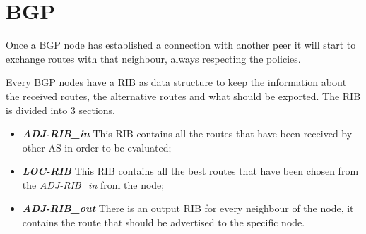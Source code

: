 
\section{BGP}
\label{sec:bgp_intro}

Once a \ac{BGP} node has established a connection with another peer it will
start to exchange routes with that neighbour, always respecting the policies.

Every \ac{BGP} nodes have a \ac{RIB} as data structure to keep the information
about the received routes, the alternative routes and what should be exported.
The \ac{RIB} is divided into \num{3} sections.
\begin{itemize}
	\item \textbf{\textit{ADJ-RIB\_in}} This \ac{RIB} contains all the routes
		that have been received by other \ac{AS} in order to be evaluated;
	\item \textbf{\textit{LOC-RIB}} This \ac{RIB} contains all the best routes
		that have been chosen from the \textit{ADJ-RIB\_in} from the node;
	\item \textbf{\textit{ADJ-RIB\_out}} There is an output \ac{RIB} for every
		neighbour of the node, it contains the route that should be advertised 
		to the specific node.
\end{itemize}

